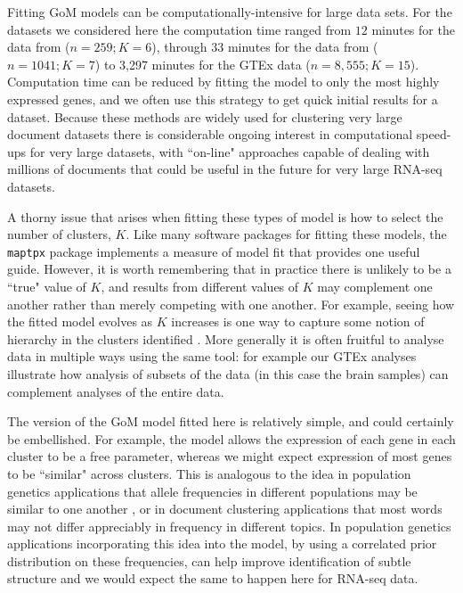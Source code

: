 Fitting GoM models can be computationally-intensive for large data sets.
For the datasets we considered here the computation time ranged from $12$ minutes for the data from \cite{Deng2014} ($n=259; K=6$), through $33$ minutes for the 
data from \cite{Jaitin2014} ($n=1041; K=7$) to 3,297 minutes for the GTEx data ($n=8,555; K=15$). 
Computation time can be reduced by fitting the model to only the most highly expressed genes, and we often use this strategy to get quick initial results for a dataset.
Because these methods are widely used for clustering very large document datasets there is considerable ongoing interest in 
computational speed-ups for very large datasets, with ``on-line" approaches capable of dealing with millions of documents  \cite{Hoffman2010} that could be useful in the future for very large RNA-seq datasets. 

A thorny issue that arises when fitting these types of model is how to select the number of clusters, $K$. Like many software packages
for fitting these models, the {\tt maptpx} package implements a measure of model fit that provides one useful guide. However, it is
worth remembering that in practice there is unlikely to be a ``true" value of $K$, and results from different 
values of $K$ may complement one another rather than merely competing with one another. For example, seeing how the fitted model evolves
as $K$ increases is one way to capture some notion of hierarchy in the clusters identified \cite{Rosenberg2002}. More generally it is often
fruitful to analyse data in multiple ways using the same tool: for example our GTEx analyses illustrate how 
analysis of subsets of the data (in this case the brain samples) can complement analyses of the entire data.

The version of the GoM model fitted here is relatively simple, and could certainly be embellished. For example,
the model allows the expression of each gene in each cluster to be a free parameter, whereas we might expect expression of most
genes to be ``similar" across clusters. This is analogous to the idea in population genetics applications that allele frequencies in different populations may
be similar to one another \cite{Falush2003}, or in document clustering applications that most words may not differ appreciably in frequency in different topics. 
In population genetics applications incorporating this idea into the model, by using a correlated prior distribution on these frequencies, 
can help improve identification of subtle structure \cite{Falush2003} and we would expect the same to happen here for RNA-seq data.


